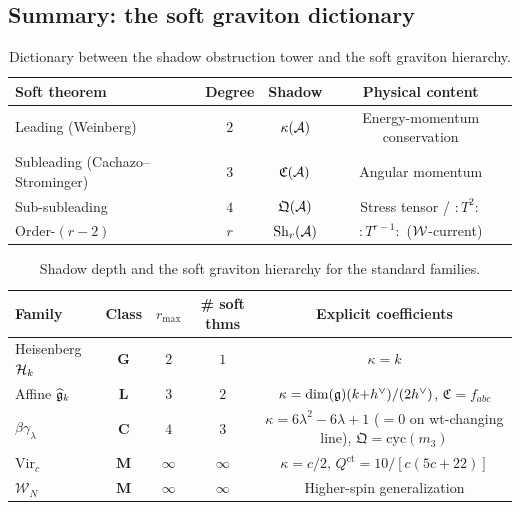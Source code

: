 %
%

\subsection{Summary: the soft graviton dictionary}
\label{subsec:thqg-VI-summary}

\begin{table}[ht]
\centering
\small
\renewcommand{\arraystretch}{1.25}
\begin{tabular}{lccc}
\toprule
\textbf{Soft theorem} &
\textbf{Degree} &
\textbf{Shadow} &
\textbf{Physical content} \\
\midrule
Leading (Weinberg) &
 $2$ & $\kappa(\mathcal{A})$ &
 Energy-momentum conservation \\
Subleading (Cachazo--Strominger) &
 $3$ & $\mathfrak{C}(\mathcal{A})$ &
 Angular momentum \\
Sub-subleading &
 $4$ & $\mathfrak{Q}(\mathcal{A})$ &
 Stress tensor / $:T^2:$ \\
Order-$(r-2)$ &
 $r$ & $\operatorname{Sh}_r(\mathcal{A})$ &
 $:T^{r-1}:$ ($\mathcal{W}$-current) \\
\bottomrule
\end{tabular}
\caption{Dictionary between the shadow obstruction tower and the
soft graviton hierarchy.}
\label{tab:thqg-VI-soft-dictionary}
\end{table}

\begin{table}[ht]
\centering
\small
\renewcommand{\arraystretch}{1.25}
\begin{tabular}{lcccc}
\toprule
\textbf{Family} &
\textbf{Class} &
$r_{\max}$ &
\textbf{\# soft thms} &
\textbf{Explicit coefficients} \\
\midrule
Heisenberg $\mathcal{H}_k$ &
 $\mathbf{G}$ & $2$ & $1$ &
 $\kappa = k$ \\
Affine $\widehat{\mathfrak{g}}_k$ &
 $\mathbf{L}$ & $3$ & $2$ &
 $\kappa = \dim(\mathfrak{g})(k{+}h^\vee)/(2h^\vee)$, $\mathfrak{C} = f_{abc}$ \\
$\beta\gamma_\lambda$ &
 $\mathbf{C}$ & $4$ & $3$ &
 $\kappa = 6\lambda^2{-}6\lambda{+}1$ \textup{(}$= 0$ on wt-changing line\textup{)}, $\mathfrak{Q} = \mathrm{cyc}(m_3)$ \\
$\mathrm{Vir}_c$ &
 $\mathbf{M}$ & $\infty$ & $\infty$ &
 $\kappa = c/2$, $Q^{\mathrm{ct}} = 10/[c(5c+22)]$ \\
$\mathcal{W}_N$ &
 $\mathbf{M}$ & $\infty$ & $\infty$ &
 Higher-spin generalization \\
\bottomrule
\end{tabular}
\caption{Shadow depth and the soft graviton hierarchy for the
standard families.}
\label{tab:thqg-VI-family-soft}
\end{table}

